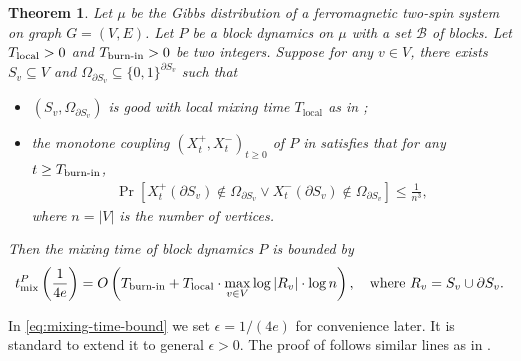 \documentclass[11pt]{amsart}
\renewcommand{\Pr}{\mathop{\mathrm{Pr}}\nolimits}
\def\+#1{\mathcal{#1}}
\newtheorem{theorem}{Theorem}
\theoremstyle{definition}
\theoremstyle{remark}
\begin{document}
\begin{theorem}\label{thm:mixing}
Let $\mu$ be the Gibbs distribution of a ferromagnetic two-spin system on graph $G=(V,E)$. Let $P$ be a block dynamics on $\mu$ with a set $\+B$ of blocks. 
Let $T_{\textnormal{local}} > 0$ and $T_{\textnormal{burn-in}} > 0$ be two integers. 
Suppose for any $v \in V$, there exists $S_v \subseteq V$ and $\Omega_{\partial S_v} \subseteq \{0,1\}^{\partial S_v}$ such that
\begin{itemize}
  \item $(S_v,\Omega_{\partial S_v})$ is good with local mixing time $T_{\text{local}}$ as in ;
    \item the monotone coupling $(X_t^+,X_t^-)_{t \geq 0}$ of $P$ in  satisfies that %
    for any $t \geq T_{\textnormal{burn-in}}$,
    \begin{align}\label{eq:burn-in}
         \Pr[X^+_t(\partial S_v) \notin \Omega_{\partial S_v} \lor X^-_t(\partial S_v) \notin \Omega_{\partial S_v}] \leq \frac{1}{n^3},
    \end{align}
    where $n = |V|$ is the number of vertices.
\end{itemize}
Then the mixing time of block dynamics $P$ is bounded by
\begin{align}\label{eq:mixing-time-bound}
t_{\textnormal{mix}}^P\left(\frac{1}{4e}\right) = O\left(T_{\textnormal{burn-in}} + T_{\textnormal{local}} \cdot \max_{v \in V}\log |R_v|\cdot \log n\right), \quad \text{where } R_v = S_v \cup \partial S_v.
\end{align}
\end{theorem}

In \eqref{eq:mixing-time-bound} we set $\epsilon=1/(4e)$ for convenience later.
It is standard to extend it to general $\epsilon>0$.
The proof of  follows similar lines as in \cite{MS13}.
\end{document}
